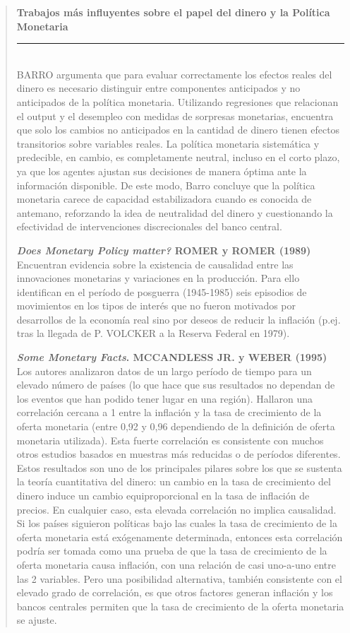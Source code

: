 \documentclass[10pt,a4paper]{article}
\newenvironment{specialblock}[1]{%
      \begin{quote} %
      \small %
      \noindent\textbf{#1}\\[-0.3em] %
      \rule{\linewidth}{0.4pt}\\[0.6em]}{
      \end{quote}}
\begin{document}
\begin{specialblock}{Trabajos más influyentes sobre el papel del dinero y la Política Monetaria}
    BARRO argumenta que para evaluar correctamente los efectos reales del dinero es necesario distinguir entre componentes anticipados y no anticipados de la política monetaria. Utilizando regresiones que relacionan el output y el desempleo con medidas de sorpresas monetarias, encuentra que solo los cambios no anticipados en la cantidad de dinero tienen efectos transitorios sobre variables reales. La política monetaria sistemática y predecible, en cambio, es completamente neutral, incluso en el corto plazo, ya que los agentes ajustan sus decisiones de manera óptima ante la información disponible. De este modo, Barro concluye que la política monetaria carece de capacidad estabilizadora cuando es conocida de antemano, reforzando la idea de neutralidad del dinero y cuestionando la efectividad de intervenciones discrecionales del banco central.

    \textbf{\textit{Does Monetary Policy matter?} ROMER y ROMER (1989)}
    Encuentran evidencia sobre la existencia de causalidad entre las innovaciones monetarias y variaciones en la producción. Para ello identifican en el período de posguerra (1945-1985) seis episodios de movimientos en los tipos de interés que no fueron motivados por desarrollos de la economía real sino por deseos de reducir la inflación (p.ej. tras la llegada de P. VOLCKER a la Reserva Federal en 1979). 

    \textbf{\textit{Some Monetary Facts}. MCCANDLESS JR. y WEBER (1995)}
    Los autores analizaron datos de un largo período de tiempo para un elevado número de países (lo que hace que sus resultados no dependan de los eventos que han podido tener lugar en una región). Hallaron una correlación cercana a 1 entre la inflación y la tasa de crecimiento de la oferta monetaria (entre 0,92 y 0,96 dependiendo de la definición de oferta monetaria utilizada). Esta fuerte correlación es consistente con muchos otros estudios basados en muestras más reducidas o de períodos diferentes. Estos resultados son uno de los principales pilares sobre los que se sustenta la teoría cuantitativa del dinero: un cambio en la tasa de crecimiento del dinero induce un cambio equiproporcional en la tasa de inflación de precios. En cualquier caso, esta elevada correlación no implica causalidad. Si los países siguieron políticas bajo las cuales la tasa de crecimiento de la oferta monetaria está exógenamente determinada, entonces esta correlación podría ser tomada como una prueba de que la tasa de crecimiento de la oferta monetaria causa inflación, con una relación de casi uno-a-uno entre las 2 variables. Pero una posibilidad alternativa, también consistente con el elevado grado de correlación, es que otros factores generan inflación y los bancos centrales permiten que la tasa de crecimiento de la oferta monetaria se ajuste.


\end{specialblock}
\end{document}
